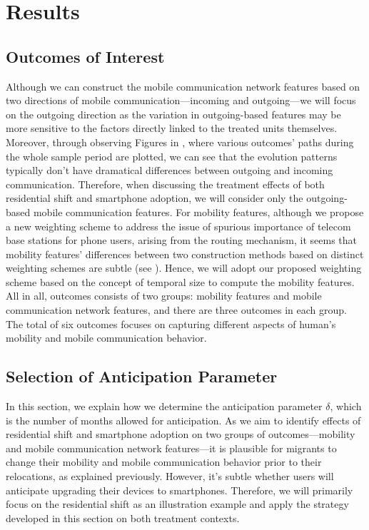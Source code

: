 
\chapter{Results}\label{results}
\section{Outcomes of Interest}
Although we can construct the mobile communication network features based on two directions of mobile communication---incoming and outgoing---we will focus on the outgoing direction as the variation in outgoing-based features may be more sensitive to the factors directly linked to the treated units themselves.
Moreover, through observing Figures in , where various outcomes' paths during the whole sample period are plotted, we can see that the evolution patterns typically don't have dramatical differences between outgoing and incoming communication.
Therefore, when discussing the treatment effects of both residential shift and smartphone adoption, we will consider only the outgoing-based mobile communication features.
For mobility features, although we propose a new weighting scheme to address the issue of spurious importance of telecom base stations for phone users, arising from the routing mechanism, it seems that mobility features' differences between two construction methods based on distinct weighting schemes are subtle (see ).
Hence, we will adopt our proposed weighting scheme based on the concept of temporal size to compute the mobility features.
All in all, outcomes consists of two groups: mobility features and mobile communication network features, and there are three outcomes in each group.
The total of six outcomes focuses on capturing different aspects of human's mobility and mobile communication behavior.

\section{Selection of Anticipation Parameter}
In this section, we explain how we determine the anticipation parameter $\delta$, which is the number of months allowed for anticipation.
As we aim to identify effects of residential shift and smartphone adoption on two groups of outcomes---mobility and mobile communication network features---it is plausible for migrants to change their mobility and mobile communication behavior prior to their relocations, as explained previously.
However, it's subtle whether users will anticipate upgrading their devices to smartphones.
Therefore, we will primarily focus on the residential shift as an illustration example and apply the strategy developed in this section on both treatment contexts.


